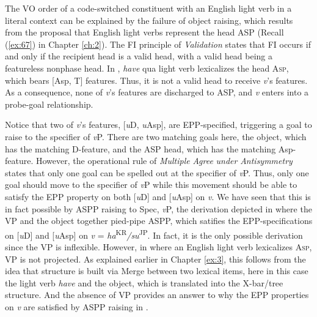 The \ac{VO} order of a code-switched constituent with an English light verb in a literal context can be explained by the failure of object raising, which results from the proposal that English light verbs represent the head \ac{ASP} (Recall (\ref{ex:67}) in Chapter \ref{ch:2}). The \ac{FI} principle of \textit{Validation} states that \ac{FI} occurs if and only if the recipient head is a valid head, with a valid head being a featureless nonphase head. In , \textit{have} qua light verb lexicalizes the head A\textsc{sp,}  which bears [Asp, T] features. Thus, it is not a valid head to receive \textit{v}’s features. As a consequence, none of \textit{v}’s features are discharged to \ac{ASP}, and \textit{v} enters into a probe-goal relationship.

\ea\label{ex:119}
\z
              
Notice that two of \textit{v}’s features, [\textit{u}D, \textit{u}Asp], are \ac{EPP}-specified, triggering a goal to raise to the specifier of \textit{v}P. There are two matching goals here, the object, which has the matching D-feature, and the \ac{ASP} head, which has the matching Asp-feature. However, the operational rule of \textit{Multiple} \textit{Agree} \textit{under} \textit{Antisymmetry} states that only one goal can be spelled out at the specifier of \textit{v}P. Thus, only one goal should move to the specifier of \textit{v}P while this movement should be able to satisfy the \ac{EPP} property on both [\textit{u}D] and [\textit{u}Asp] on \textit{v}. We have seen that this is in fact possible by \ac{ASP}P raising to Spec, \textit{v}P, the derivation depicted in  where the \acs{VP} and the object together pied-pipe \ac{ASP}P, which satifies the \ac{EPP}-specifications on [\textit{u}D] and [\textit{u}Asp] on \textit{v} = \textit{ha}\textsuperscript{KR}\textit{/su}\textsuperscript{JP}. In fact, it is the only possible derivation since the \acs{VP} is inflexible. However, in  where an English light verb lexicalizes A\textsc{sp,} \acs{VP} is not projected. As explained earlier in Chapter \ref{ex:3}, this follows from the idea that structure is built via Merge between two lexical items, here in this case the light verb \textit{have} and the object, which is translated into the X-bar/tree structure. And the absence of \acs{VP} provides an answer to why the \ac{EPP} properties on \textit{v} are satisfied by \ac{ASP}P raising in .

